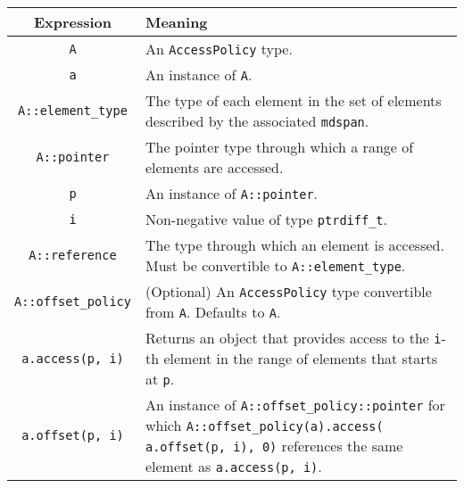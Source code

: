 \begin{tabular}{|c|p{15em}|}
\hline
Expression & Meaning \\
\hline
    \texttt{A} & An \texttt{AccessPolicy} type. \\
    \texttt{a} & An instance of \texttt{A}. \\
    \texttt{A::element\_type} & The type of each element in the set of elements described by the associated \texttt{mdspan}. \\
    \texttt{A::pointer} & The pointer type through which a range of elements are accessed. \\
    \texttt{p} & An instance of \texttt{A::pointer}. \\
    \texttt{i} & Non-negative value of type \texttt{ptrdiff\_t}. \\
    \texttt{A::reference} & The type through which an element is accessed.  Must be convertible to \texttt{A::element\_type}. \\
    \texttt{A::offset\_policy} & (Optional) An \texttt{AccessPolicy} type convertible from \texttt{A}. Defaults to \texttt{A}. \\
    \texttt{a.access(p, i)} & Returns an object that provides access to the \texttt{i}-th element in the range of elements that starts at \texttt{p}. \\
    \texttt{a.offset(p, i)} & An instance of \texttt{A::offset\_policy::pointer} for which \texttt{A::offset\_policy(a).access( a.offset(p, i), 0)} references the same element as \texttt{a.access(p, i)}. \\
\hline
\end{tabular}
